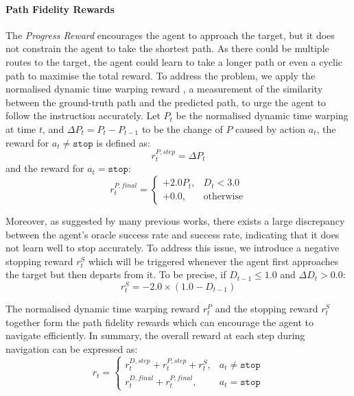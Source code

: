 \documentclass[final]{cvpr}
\begin{document}
\paragraph{Path Fidelity Rewards}
The \textit{Progress Reward} encourages the agent to approach the target, but it does not constrain the agent to take the shortest path. As there could be multiple routes to the target, the agent could learn to take a longer path or even a cyclic path to maximise the total reward. To address the problem, we apply the normalised dynamic time warping reward \cite{ilharco2019general}, a measurement of the similarity between the ground-truth path and the predicted path, to urge the agent to follow the instruction accurately. Let $P_{t}$ be the normalised dynamic time warping \cite{ilharco2019general} at time $t$, and ${\Delta}P_{t}=P_{t}-P_{t-1}$ to be the change of $P$ caused by action $a_{t}$, the reward for $a_{t}{\neq}\texttt{stop}$ is defined as:
\begin{equation}
r^{P,step}_{t}={\Delta}P_{t}
\label{eqn:reward_ndtw}
\end{equation}
and the reward for $a_{t}{=}\texttt{stop}$:
\begin{equation}
r^{P,final}_{t}=
\begin{cases}
    +2.0P_{t},     & D_{t}<3.0 \\
    +0.0,          & \text{otherwise}
\end{cases}
\label{eqn:reward_ndtwf}
\end{equation}

Moreover, as suggested by many previous works, there exists a large discrepancy between the agent's oracle success rate and success rate, indicating that it does not learn well to stop accurately. To address this issue, we introduce a negative stopping reward $r^{S}_{t}$ which will be triggered whenever the agent first approaches the target but then departs from it. To be precise, if $D_{t-1}{\leq}1.0$ and ${\Delta}D_{t}>0.0$:
\begin{equation}
r^{S}_{t}=-2.0{\times}(1.0-D_{t-1})
\label{eqn:reward_stop}
\end{equation}

The normalised dynamic time warping reward $r^{P}_{t}$ and the stopping reward $r^{S}_{t}$ together form the path fidelity rewards which can encourage the agent to navigate efficiently.
In summary, the overall reward at each step during navigation can be expressed as:
\begin{equation}
r_{t}=
\begin{cases}
    r^{D,step}_{t}+r^{P,step}_{t}+r^{S}_{t},  & a_{t}{\neq}\texttt{stop} \\
    r^{D,final}_{t}+r^{P,final}_{t},          & a_{t}{=}\texttt{stop}
\end{cases}
\label{eqn:reward_all}
\end{equation}
\end{document}
